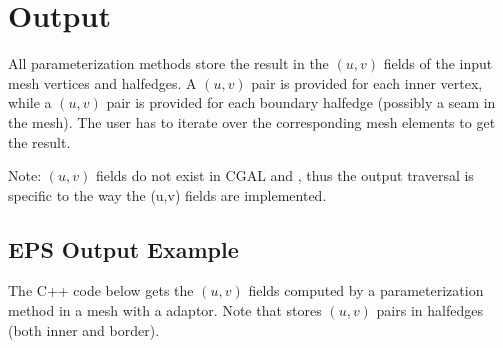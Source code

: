 \section{Output}

All parameterization methods store the result in the $(u,v)$ fields of
the input mesh vertices and halfedges. A $(u,v)$ pair is provided for
each inner vertex, while a $(u,v)$ pair is provided for each boundary
halfedge (possibly a seam in the mesh). The user has to iterate over
the corresponding mesh elements to get the result.

Note: $(u,v)$ fields do not exist in CGAL  and
, thus the output traversal is specific to the way the (u,v) fields are implemented.

\subsection{EPS Output Example}

The C++ code below gets the $(u,v)$ fields computed by a
parameterization method in a  mesh with a
 adaptor.  Note that
 stores $(u,v)$ pairs in
halfedges (both inner and border).

